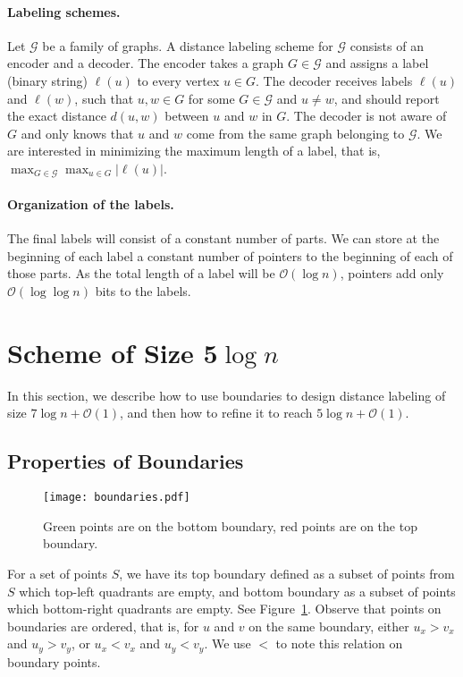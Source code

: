 \documentclass[a4paper,11pt]{article}
\newcommand{\Oh}{\mathcal{O}}
\begin{document}
\paragraph{Labeling schemes.}
Let $\mathcal{G}$ be a family of graphs.
A distance labeling scheme for $\mathcal{G}$ consists of an encoder and a decoder.
The encoder takes a graph $G\in \mathcal{G}$ and assigns
a label (binary string) $\ell(u)$ to every vertex $u\in G$.
The decoder receives labels $\ell(u)$ and $\ell(w)$,
such that $u,w\in G$ for some $G\in \mathcal{G}$ and $u \neq w$,
and should report the exact distance $d(u,w)$ between $u$ and $w$ in $G$.
The decoder is not aware of $G$ and only knows that $u$
and $w$ come from the same graph belonging to $\mathcal{G}$.
We are interested in minimizing the maximum length of a label, that is, $\max_{G\in \mathcal{G}}\max_{u\in G} |\ell(u)|$.

\paragraph{Organization of the labels.}
The final labels will consist of a constant number of parts.
We can store at the beginning of each label a constant number of pointers to the beginning of each of those parts.
As the total length of a label will be $\Oh(\log{n})$, pointers add only $\Oh(\log{\log{n}})$ bits to the labels.



\section{Scheme of Size 5$\log{n}$}
\label{Sec:5log}
In this section, we describe how to use boundaries to design distance labeling of size $7\log{n}+\Oh(1)$,
and then how to refine it to reach $5\log{n}+\Oh(1)$.

\subsection{Properties of Boundaries}

\begin{figure}[h]
\begin{center}
  \texttt{[image: boundaries.pdf]}
\end{center}
\caption{Green points are on the bottom boundary, red points are on the top boundary.}
\label{Fig:Boundaries}
\end{figure}

For a set of points $S$, we have its top boundary defined as a subset of points from $S$ which top-left quadrants are empty,
and bottom boundary as a subset of points which bottom-right quadrants are empty.
See Figure~\ref{Fig:Boundaries}.
Observe that points on boundaries are ordered, that is, for $u$ and $v$ on the same boundary, either $u_x>v_x$ and $u_y>v_y$,
or $u_x<v_x$ and $u_y<v_y$.
We use $<$ to note this relation on boundary points.
\end{document}
